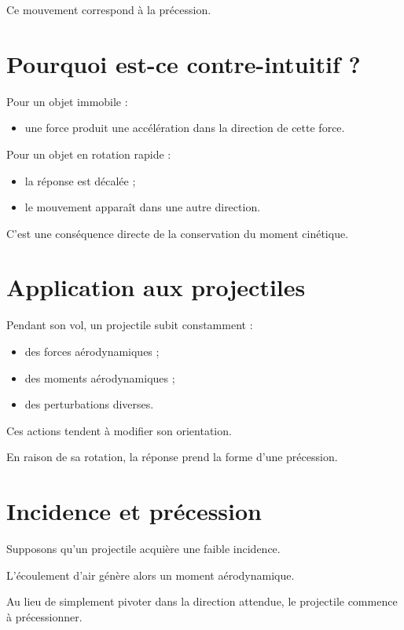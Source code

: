 Ce mouvement correspond à la précession.

\section{Pourquoi est-ce contre-intuitif ?}

Pour un objet immobile :

\begin{itemize}
    \item une force produit une accélération dans la direction de cette force.
\end{itemize}

Pour un objet en rotation rapide :

\begin{itemize}
    \item la réponse est décalée ;
    \item le mouvement apparaît dans une autre direction.
\end{itemize}

C'est une conséquence directe de la conservation du moment cinétique.

\section{Application aux projectiles}

Pendant son vol, un projectile subit constamment :

\begin{itemize}
    \item des forces aérodynamiques ;
    \item des moments aérodynamiques ;
    \item des perturbations diverses.
\end{itemize}

Ces actions tendent à modifier son orientation.

En raison de sa rotation, la réponse prend la forme d'une précession.

\section{Incidence et précession}

Supposons qu'un projectile acquière une faible incidence.

L'écoulement d'air génère alors un moment aérodynamique.

Au lieu de simplement pivoter dans la direction attendue, le projectile
commence à précessionner.

